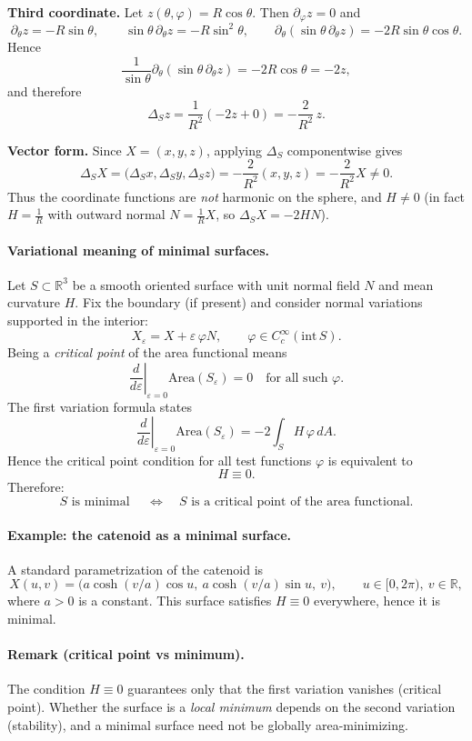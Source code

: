 \documentclass[12pt,a4paper]{article}
\theoremstyle{plain}
\theoremstyle{definition}      %
\begin{document}
\medskip
\textbf{Third coordinate.}
Let $z(\theta,\varphi)=R\cos\theta$. Then $\partial_\varphi z=0$ and
\[
\partial_\theta z=-R\sin\theta,\qquad
\sin\theta\,\partial_\theta z=-R\sin^2\theta,\qquad
\partial_\theta(\sin\theta\,\partial_\theta z)=-2R\sin\theta\cos\theta.
\]
Hence
\[
\frac{1}{\sin\theta}\partial_\theta(\sin\theta\,\partial_\theta z)=-2R\cos\theta=-2z,
\]
and therefore
\[
\Delta_S z
=\frac{1}{R^2}\left(-2z+0\right)
=-\frac{2}{R^2}\,z.
\]

\medskip
\textbf{Vector form.}
Since $X=(x,y,z)$, applying $\Delta_S$ componentwise gives
\[
\Delta_S X=\bigl(\Delta_S x,\Delta_S y,\Delta_S z\bigr)
=-\frac{2}{R^2}(x,y,z)
=-\frac{2}{R^2}X\neq 0.
\]
Thus the coordinate functions are \emph{not} harmonic on the sphere, and $H\neq 0$
(in fact $H=\frac{1}{R}$ with outward normal $N=\frac{1}{R}X$, so $\Delta_S X=-2HN$).

\paragraph{Variational meaning of minimal surfaces.}
Let $S\subset\mathbb{R}^3$ be a smooth oriented surface with unit normal field $N$ and mean curvature $H$.
Fix the boundary (if present) and consider normal variations supported in the interior:
\[
X_\varepsilon = X+\varepsilon\,\varphi N,\qquad \varphi\in C_c^\infty(\mathrm{int}\,S).
\]
Being a \emph{critical point} of the area functional means
\[
\left.\frac{d}{d\varepsilon}\right|_{\varepsilon=0}\mathrm{Area}(S_\varepsilon)=0
\quad \text{for all such }\varphi.
\]
The first variation formula states
\[
\left.\frac{d}{d\varepsilon}\right|_{\varepsilon=0}\mathrm{Area}(S_\varepsilon)
= -2\int_S H\,\varphi\,dA.
\]
Hence the critical point condition for all test functions $\varphi$ is equivalent to
\[
H\equiv 0.
\]
Therefore:
\[
S \text{ is minimal } \quad\Longleftrightarrow\quad S \text{ is a critical point of the area functional.}
\]

\medskip
\paragraph{Example: the catenoid as a minimal surface.}
A standard parametrization of the catenoid is
\[
X(u,v)=\bigl(a\cosh(v/a)\cos u,\ a\cosh(v/a)\sin u,\ v\bigr),
\qquad u\in[0,2\pi),\ v\in\mathbb{R},
\]
where $a>0$ is a constant. This surface satisfies $H\equiv 0$ everywhere, hence it is minimal.

\medskip
\paragraph{Remark (critical point vs minimum).}
The condition $H\equiv 0$ guarantees only that the first variation vanishes (critical point).
Whether the surface is a \emph{local minimum} depends on the second variation (stability), and a minimal surface
need not be globally area-minimizing.
\end{document}
